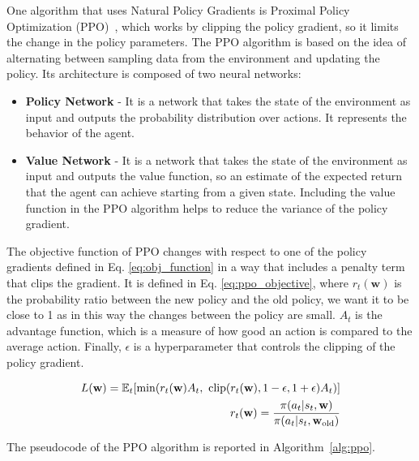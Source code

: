 One algorithm that uses Natural Policy Gradients is Proximal Policy Optimization (PPO)~\citep{schulman2017proximal}, which works by clipping the policy gradient, so it limits the change in the policy parameters.
The PPO algorithm is based on the idea of alternating between sampling data from the environment and updating the policy.
Its architecture is composed of two neural networks:

\begin{itemize}
    \item \textbf{Policy Network} - It is a network that takes the state of the environment as input and outputs the probability distribution over actions.
    It represents the behavior of the agent.
    \item \textbf{Value Network} - It is a network that takes the state of the environment as input and outputs the value function, so an estimate of the expected return that the agent can achieve starting from a given state.
    Including the value function in the PPO algorithm helps to reduce the variance of the policy gradient.
\end{itemize}

The objective function of PPO changes with respect to one of the policy gradients defined in Eq. \ref{eq:obj_function} in a way that includes a penalty term that clips the gradient.
It is defined in Eq. \ref{eq:ppo_objective}, where $r_t(\textbf{w})$ is the probability ratio between the new policy and the old policy, we want it to be close to 1 as in this way the changes between the policy are small. 
$A_t$ is the advantage function, which is a measure of how good an action is compared to the average action.
Finally, $\epsilon$ is a hyperparameter that controls the clipping of the policy gradient.

\begin{equation} \label{eq:ppo_objective}
\begin{split}
    L(\textbf{w}) = \E_t [\min( r_t(\textbf{w})A_t, \ \text{clip}(r_t(\textbf{w}), 1-\epsilon, 1+\epsilon)A_t)] \\
    r_t(\textbf{w}) = \frac{\pi(a_t|s_t, \textbf{w})}{\pi(a_t|s_t, \textbf{w}_{\text{old}})}
\end{split}
\end{equation}

The pseudocode of the PPO algorithm is reported in Algorithm~\ref{alg:ppo}.



